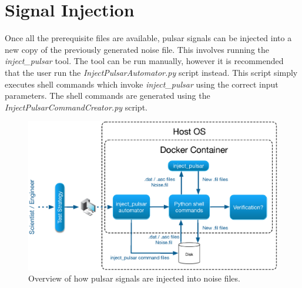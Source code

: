 \documentclass[preprint,authoryear,5p,twocolumn]{elsarticle_mod}
\begin{document}
\section{Signal Injection}
Once all the prerequisite files are available, pulsar signals can be injected into a new copy of the previously generated noise file. This involves running the \textit{inject\_pulsar} tool. The tool can be run manually, however it is recommended that the user run the \textit{InjectPulsarAutomator.py} script instead. This script simply executes shell commands which invoke \textit{inject\_pulsar} using the correct input parameters. The shell commands are generated using the \textit{InjectPulsarCommandCreator.py} script. 
\begin{figure}
	\centering
		\includegraphics[scale=0.5]{images/eps/Prereqs.eps}
		\caption[]{Overview of how pulsar signals are injected into noise files. }
	\label{Fig:Injection}
\end{figure}
\end{document}
